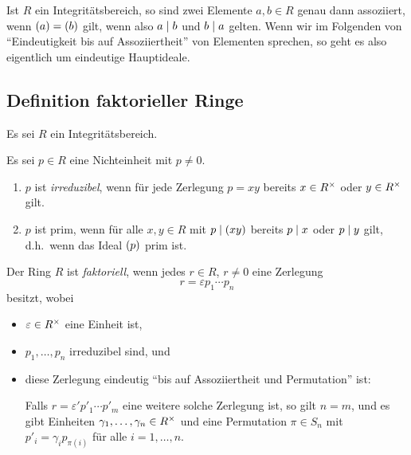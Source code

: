\begin{remark}
  Ist $R$ ein Integritätsbereich, so sind zwei Elemente $a, b \in R$ genau dann assoziiert, wenn $(a) = (b)$ gilt, wenn also $a \mathrel{|} b$ und $b \mathrel{|} a$ gelten.
  Wenn wir im Folgenden von \enquote{Eindeutigkeit bis auf Assoziiertheit} von Elementen sprechen, so geht es also eigentlich um eindeutige Hauptideale.
\end{remark}



\subsection{Definition faktorieller Ringe}

Es sei $R$ ein Integritätsbereich.

\begin{definition}
  Es sei $p \in R$ eine Nichteinheit mit $p \neq 0$.
  \begin{enumerate}
    \item
      $p$ ist \emph{irreduzibel}, wenn für jede Zerlegung $p = xy$ bereits $x \in R^{\times}$ oder $y \in R^{\times}$ gilt.
    \item
       $p$ ist prim, wenn für alle $x, y \in R$ mit $p \mathrel{|} (xy)$ bereits $p \mathrel{|} x$ oder $p \mathrel{|} y$ gilt, d.h.\ wenn das Ideal $(p)$ prim ist.
  \end{enumerate}
\end{definition}


\begin{definition}
\label{definition: ufd}
  Der Ring $R$ ist \emph{faktoriell}, wenn jedes $r \in R$, $r \neq 0$ eine Zerlegung
  \begin{equation}
  \label{equation: decomposition into irreducibles}
    r = \varepsilon p_1 \dotsm p_n
  \end{equation}
  besitzt, wobei
  \begin{itemize}
    \item
      $\varepsilon \in R^{\times}$ eine Einheit ist,
    \item
      $p_1, \dotsc, p_n$ irreduzibel sind, und
    \item
      diese Zerlegung eindeutig \enquote{bis auf Assoziiertheit und Permutation} ist:
      
      Falls $r = \varepsilon' p'_1 \dotsm p'_m$ eine weitere solche Zerlegung ist, so gilt $n = m$, und es gibt Einheiten $\gamma_1, \dotsc, \gamma_n \in R^{\times}$ und eine Permutation $\pi \in S_n$ mit $p'_i = \gamma_i p_{\pi(i)}$ für alle $i = 1, \dotsc, n$.
  \end{itemize}
\end{definition}

